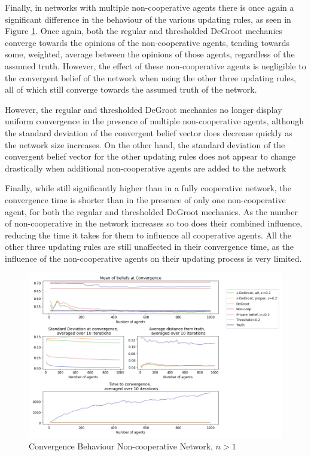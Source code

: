\documentclass[a4paper, 12pt]{report}
\begin{document}
Finally, in networks with multiple non-cooperative agents there is once again a significant difference in the behaviour of the various updating rules, as seen in Figure \ref{noncoop+:compare}. Once again, both the regular and thresholded DeGroot mechanics converge towards the opinions of the non-cooperative agents, tending towards some, weighted, average between the opinions of those agents, regardless of the assumed truth. However, the effect of these non-cooperative agents is negligible to the convergent belief of the network when using the other three updating rules, all of which still converge towards the assumed truth of the network. 

\noindent However, the regular and thresholded DeGroot mechanics no longer display uniform convergence in the presence of multiple non-cooperative agents, although the standard deviation of the convergent belief vector does decrease quickly as the network size increases. On the other hand, the standard deviation of the convergent belief vector for the other updating rules does not appear to change drastically when additional non-cooperative agents are added to the network

\noindent Finally, while still significantly higher than in a fully cooperative network, the convergence time is shorter than in the presence of only one non-cooperative agent, for both the regular and thresholded DeGroot mechanics. As the number of non-cooperative in the network increases so too does their combined influence, reducing the time it takes for them to influence all cooperative agents. All the other three updating rules are still unaffected in their convergence time, as the influence of the non-cooperative agents on their updating process is very limited.

\begin{center}
    \begin{figure}[!htbp]
        \centering
        \includegraphics[width=1.2\textwidth]{ThesisKI/Images/WisdomCompare2.png}
        \caption{Convergence Behaviour Non-cooperative Network, $n>1$}
        \label{noncoop+:compare}
    \end{figure}
\end{center}
\end{document}
